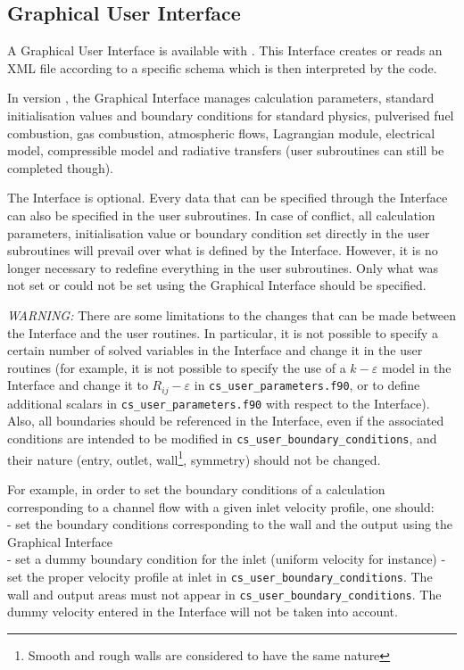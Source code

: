 {{{{%
\subsection{Graphical User Interface}
\label{sec:prg_gui}%
A Graphical User Interface is available with \CS.
This Interface creates or reads an XML file according to
a specific \CS schema which is then interpreted by the code.

In version \verscs, the Graphical Interface manages calculation parameters,
standard initialisation values and boundary
conditions for standard physics, pulverised fuel combustion, gas combustion,
atmospheric flows, Lagrangian module,  electrical model, compressible model and radiative
transfers (user subroutines can still be completed though).

The Interface is optional. Every data that can be specified through the
Interface can also be specified in the user subroutines. In case of
conflict, all calculation parameters, initialisation value or boundary condition
set directly in the user subroutines will prevail over what is defined by the
Interface. However, it is no longer necessary to redefine everything in the
user subroutines. Only what was not set or could not be set using the Graphical
Interface should be specified.

{\em WARNING: }
There are some limitations to the changes that can be made between the Interface
and the user routines. In particular, it is not possible to specify a certain
number of solved variables in the Interface and change it in the user routines
(for example, it is not possible to specify the use of a $k-\varepsilon$ model
in the Interface and change it to $R_{ij}-\varepsilon$ in \texttt{cs\_user\_parameters.f90}, or
to define additional scalars in \texttt{cs\_user\_parameters.f90} with respect to the
Interface). Also, all boundaries should be referenced in the Interface, even if
the associated conditions are intended to be modified in \texttt{cs\_user\_boundary\_conditions}, and
their nature (entry, outlet, wall\footnote{Smooth and rough walls are considered
to have the same nature}, symmetry) should not be changed.

For example, in order to set the boundary conditions of a calculation
corresponding to a channel flow with a given inlet velocity profile, one
should:\\
- set the boundary conditions corresponding to the wall and the output
using the Graphical Interface\\
- set a dummy boundary condition for the inlet (uniform velocity for instance)
- set the proper velocity profile at inlet in \texttt{cs\_user\_boundary\_conditions}. The wall and
output areas must not appear in \texttt{cs\_user\_boundary\_conditions}. The dummy velocity
entered in the Interface will not be taken into account.

}}}}
